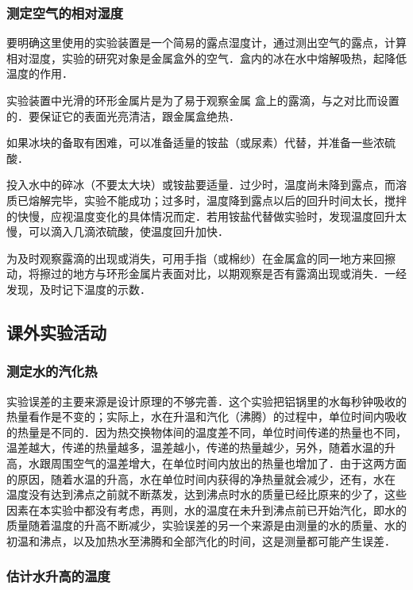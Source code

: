 \subsubsection{测定空气的相对湿度}

要明确这里使用的实验装置是一个简易的露点湿度计，通过测出空气的露点，计算相对湿度，实验的研究对象是金属盒外的空气．盒内的冰在水中熔解吸热，起降低温度的作用．

实验装置中光滑的环形金属片是为了易于观察金属
盒上的露滴，与之对比而设置的．要保证它的表面光亮清洁，跟金属盒绝热．

如果冰块的备取有困难，可以准备适量的铵盐（或尿素）代替，并准备一些浓硫酸．

投入水中的碎冰（不要太大块）或铵盐要适量．过少时，温度尚未降到露点，而溶质已熔解完毕，实验不能成功；过多时，温度降到露点以后的回升时间太长，搅拌的快慢，应视温度变化的具体情况而定．若用铵盐代替做实验时，发现温度回升太慢，可以滴入几滴浓硫酸，使温度回升加快．

为及时观察露滴的出现或消失，可用手指（或棉纱）在金属盒的同一地方来回擦动，将擦过的地方与环形金属片表面对比，以期观察是否有露滴出现或消失．一经发现，及时记下温度的示数．

\subsection{课外实验活动}
\subsubsection{测定水的汽化热}

实验误差的主要来源是设计原理的不够完善．这个实验把铝锅里的水每秒钟吸收的热量看作是不变的；实际上，水在升温和汽化（沸腾）的过程中，单位时间内吸收的热量是不同的．因为热交换物体间的温度差不同，单位时间传递的热量也不同，温差越大，传递的热量越多，温差越小，传递的热量越少，另外，随着水温的升高，水跟周围空气的温差增大，在单位时间内放出的热量也增加了．由于这两方面的原因，随着水温的升高，水在单位时间内获得的净热量就会减少，还有，水在
温度没有达到沸点之前就不断蒸发，达到沸点时水的质量已经比原来的少了，这些因素在本实验中都没有考虑，再则，水的温度在未升到沸点前已开始汽化，即水的质量随着温度的升高不断减少，实验误差的另一个来源是由测量的水的质量、水的初温和沸点，以及加热水至沸腾和全部汽化的时间，这是测量都可能产生误差．

\subsubsection{估计水升高的温度}


